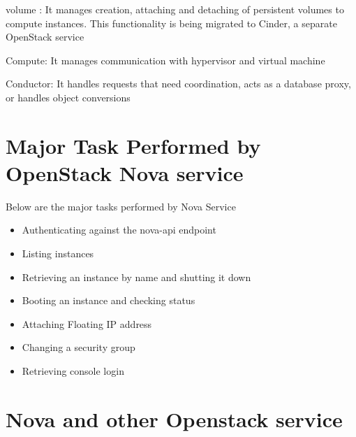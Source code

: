 \documentclass[9pt,twocolumn,twoside]{../../styles/osajnl}
\begin{document}
\begin{flushleft}

volume : It manages creation, attaching and detaching of persistent volumes to compute instances. This functionality is being migrated to Cinder, a separate OpenStack service

\end{flushleft}


\begin{flushleft}
Compute: It manages communication with hypervisor and virtual machine

\end{flushleft}


\begin{flushleft}

Conductor: It handles requests that need coordination, acts as a database proxy, or handles object conversions

\end{flushleft}




\section{Major Task Performed by OpenStack Nova service}

Below are the major tasks performed by Nova Service\cite{www-nova-ibm}
\begin{itemize}

\item Authenticating against the nova-api endpoint

\item Listing instances

\item Retrieving an instance by name and shutting it down

\item Booting an instance and checking status

\item Attaching Floating IP address

\item Changing a security group 

\item Retrieving console login

\end{itemize}

\section{Nova and other Openstack service}
\end{document}
